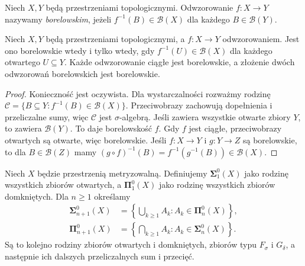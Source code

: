\begin{definicja}
\label{def:topog-polskie-odwzorowanie-borelowskie}
Niech $X,Y$ będą przestrzeniami
topologicznymi. Odwzorowanie
$f\colon X\to Y$ nazywamy
\emph{borelowskim}, jeżeli
$f^{-1}(B)\in\mathcal B(X)$
dla każdego $B\in\mathcal B(Y)$.
\end{definicja}

\begin{stwierdzenie}
\label{prop:topog-polskie-borelowskie-kryterium}
Niech $X,Y$ będą przestrzeniami
topologicznymi, a
$f\colon X\to Y$ odwzorowaniem.
Jest ono borelowskie wtedy
i tylko wtedy, gdy
$f^{-1}(U)\in\mathcal B(X)$
dla każdego otwartego
$U\subseteq Y$.
Każde odwzorowanie ciągłe
jest borelowskie, a złożenie
dwóch odwzorowań borelowskich
jest borelowskie.
\end{stwierdzenie}
\begin{proof}
Konieczność jest oczywista.
Dla wystarczalności rozważmy
rodzinę
$\mathcal C=\{B\subseteq Y:
f^{-1}(B)\in\mathcal B(X)\}$.
Przeciwobrazy zachowują
dopełnienia i przeliczalne
sumy, więc $\mathcal C$ jest
$\sigma$-algebrą. Jeśli
zawiera wszystkie otwarte
zbiory $Y$, to zawiera
$\mathcal B(Y)$. To daje
borelowskość $f$.
Gdy $f$ jest ciągłe,
przeciwobrazy otwartych
są otwarte, więc borelowskie.
Jeśli $f\colon X\to Y$
i $g\colon Y\to Z$ są
borelowskie, to dla
$B\in\mathcal B(Z)$
mamy
$(g\circ f)^{-1}(B)
=f^{-1}(g^{-1}(B))
\in\mathcal B(X)$.
\end{proof}

\begin{definicja}
\label{def:topog-polskie-hierarchia-skonczona}
Niech $X$ będzie przestrzenią
metryzowalną. Definiujemy
$\boldsymbol\Sigma^0_1(X)$
jako rodzinę wszystkich
zbiorów otwartych,
a $\boldsymbol\Pi^0_1(X)$
jako rodzinę wszystkich
zbiorów domkniętych.
Dla $n\ge1$ określamy
\[
\begin{aligned}
\boldsymbol\Sigma^0_{n+1}(X)
&=\left\{\bigcup_{k\ge1}A_k:
A_k\in\boldsymbol\Pi^0_n(X)\right\},\\
\boldsymbol\Pi^0_{n+1}(X)
&=\left\{\bigcap_{k\ge1}A_k:
A_k\in\boldsymbol\Sigma^0_n(X)\right\}.
\end{aligned}
\]
Są to kolejno rodziny
zbiorów otwartych i domkniętych,
zbiorów typu $F_\sigma$
i $G_\delta$, a następnie
ich dalszych przeliczalnych
sum i przecięć.
\end{definicja}

